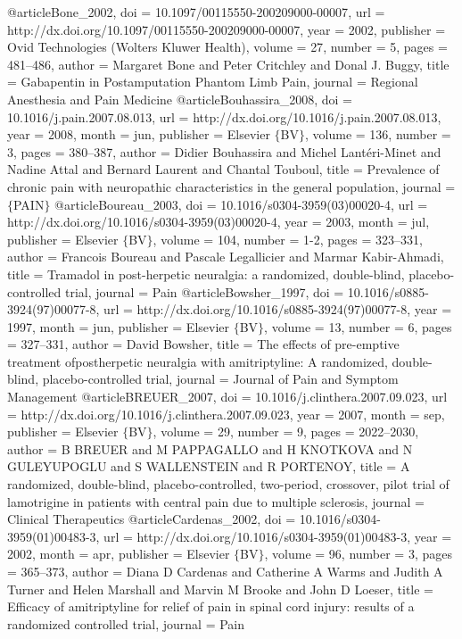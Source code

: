@article{Bone_2002,
	doi = {10.1097/00115550-200209000-00007},
	url = {http://dx.doi.org/10.1097/00115550-200209000-00007},
	year = 2002,
	publisher = {Ovid Technologies (Wolters Kluwer Health)},
	volume = {27},
	number = {5},
	pages = {481--486},
	author = {Margaret Bone and Peter Critchley and Donal J. Buggy},
	title = {Gabapentin in Postamputation Phantom Limb Pain},
	journal = {Regional Anesthesia and Pain Medicine}
}
@article{Bouhassira_2008,
	doi = {10.1016/j.pain.2007.08.013},
	url = {http://dx.doi.org/10.1016/j.pain.2007.08.013},
	year = 2008,
	month = {jun},
	publisher = {Elsevier $\lbrace$BV$\rbrace$},
	volume = {136},
	number = {3},
	pages = {380--387},
	author = {Didier Bouhassira and Michel Lant{\'{e}}ri-Minet and Nadine Attal and Bernard Laurent and Chantal Touboul},
	title = {Prevalence of chronic pain with neuropathic characteristics in the general population},
	journal = {$\lbrace$PAIN$\rbrace$}
}
@article{Boureau_2003,
	doi = {10.1016/s0304-3959(03)00020-4},
	url = {http://dx.doi.org/10.1016/s0304-3959(03)00020-4},
	year = 2003,
	month = {jul},
	publisher = {Elsevier $\lbrace$BV$\rbrace$},
	volume = {104},
	number = {1-2},
	pages = {323--331},
	author = {Francois Boureau and Pascale Legallicier and Marmar Kabir-Ahmadi},
	title = {Tramadol in post-herpetic neuralgia: a randomized, double-blind, placebo-controlled trial},
	journal = {Pain}
}
@article{Bowsher_1997,
	doi = {10.1016/s0885-3924(97)00077-8},
	url = {http://dx.doi.org/10.1016/s0885-3924(97)00077-8},
	year = 1997,
	month = {jun},
	publisher = {Elsevier $\lbrace$BV$\rbrace$},
	volume = {13},
	number = {6},
	pages = {327--331},
	author = {David Bowsher},
	title = {The effects of pre-emptive treatment ofpostherpetic neuralgia with amitriptyline: A randomized, double-blind, placebo-controlled trial},
	journal = {Journal of Pain and Symptom Management}
}
@article{BREUER_2007,
	doi = {10.1016/j.clinthera.2007.09.023},
	url = {http://dx.doi.org/10.1016/j.clinthera.2007.09.023},
	year = 2007,
	month = {sep},
	publisher = {Elsevier $\lbrace$BV$\rbrace$},
	volume = {29},
	number = {9},
	pages = {2022--2030},
	author = {B BREUER and M PAPPAGALLO and H KNOTKOVA and N GULEYUPOGLU and S WALLENSTEIN and R PORTENOY},
	title = {A randomized, double-blind, placebo-controlled, two-period, crossover, pilot trial of lamotrigine in patients with central pain due to multiple sclerosis},
	journal = {Clinical Therapeutics}
}
@article{Cardenas_2002,
	doi = {10.1016/s0304-3959(01)00483-3},
	url = {http://dx.doi.org/10.1016/s0304-3959(01)00483-3},
	year = 2002,
	month = {apr},
	publisher = {Elsevier $\lbrace$BV$\rbrace$},
	volume = {96},
	number = {3},
	pages = {365--373},
	author = {Diana D Cardenas and Catherine A Warms and Judith A Turner and Helen Marshall and Marvin M Brooke and John D Loeser},
	title = {Efficacy of amitriptyline for relief of pain in spinal cord injury: results of a randomized controlled trial},
	journal = {Pain}
}
